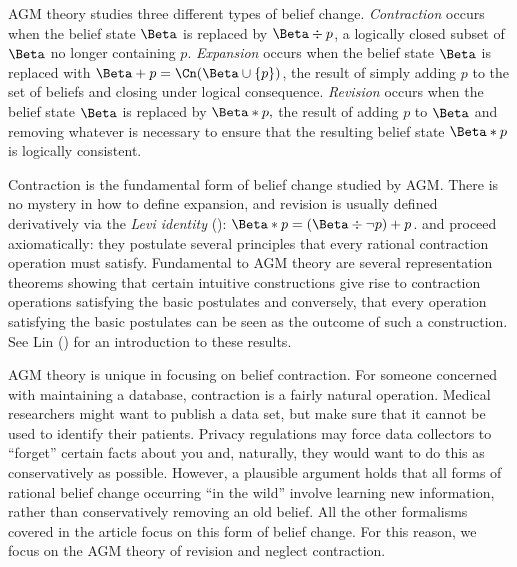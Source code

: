 AGM theory studies three different types of belief change. {\em Contraction}
occurs when the belief state $\Beta$ is replaced by $\Beta \div p$, a logically
closed subset of $\Beta$ no longer containing $p$. {\em Expansion} occurs when
the belief state $\Beta$ is replaced with $\Beta+p = \Cn(\Beta \cup \{p\})$, the
result of simply adding $p$ to the set of beliefs and closing under logical
consequence. {\em Revision} occurs when the belief state $\Beta$ is replaced by
$\Beta*p,$ the result of adding $p$ to $\Beta$ and removing whatever is
necessary to ensure that the resulting belief state $\Beta*p$ is logically
consistent.

Contraction is the fundamental form of belief change studied by AGM. There is no
mystery in how to define expansion, and revision is usually defined derivatively
via the {\em Levi identity} (): $\Beta*p =
(\Beta \div \neg p) + p$. \citet{alchourron1985logic} and \citet{
gardenfors1988revisions} proceed axiomatically: they postulate several
principles that every rational contraction operation must satisfy.  Fundamental
to AGM theory are several representation theorems showing that certain intuitive
constructions give rise to contraction operations satisfying the basic
postulates and conversely, that every operation satisfying the basic postulates
can be seen as the outcome of such a construction. See Lin () for
an introduction to these results.  

AGM theory is unique in focusing on belief contraction. For someone concerned
with maintaining a database, contraction is a fairly natural operation. Medical
researchers might want to publish a data set, but make sure that it cannot be
used to identify their patients. Privacy regulations may force data collectors
to ``forget'' certain facts about you and, naturally, they would want to do this
as conservatively as possible.  However, a plausible argument holds that all
forms of rational belief change occurring ``in the wild'' involve learning new
information, rather than conservatively removing an old belief. All the other
formalisms covered in the article focus on this form of belief change. For this
reason, we focus on the AGM theory of revision and neglect contraction.

